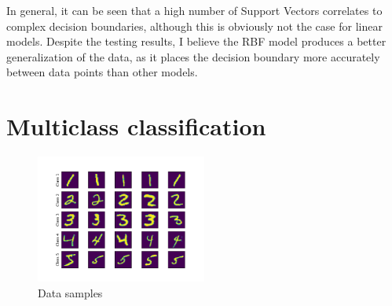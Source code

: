 \documentclass[a4paper]{article}
\begin{document}
In general, it can be seen that a high number of Support Vectors correlates to complex decision boundaries, although this is obviously not the case for linear models.  Despite the testing results, I believe the RBF model produces a better generalization of the data, as it places the decision boundary more accurately between data points than other models.
\clearpage

\section{Multiclass classification}
\begin{figure}[h]
  \begin{center}
    \includegraphics[width=0.5\textwidth]{3.png}
    \caption{Data samples}
  \end{center}
\end{figure}
\end{document}
